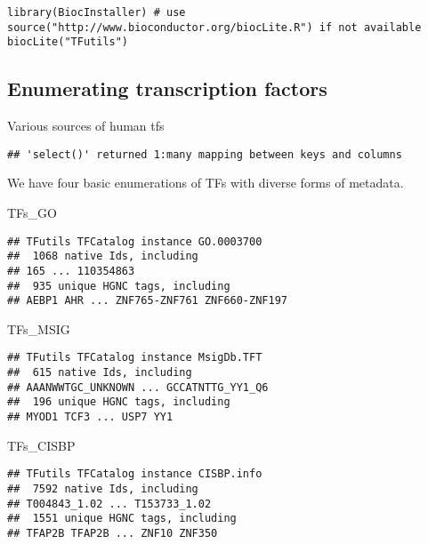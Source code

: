 \documentclass[9pt,a4paper,]{extarticle}
\newenvironment{Shaded}{\begin{snugshade}}{\end{snugshade}}
\newcommand{\NormalTok}[1]{#1}
\begin{document}
\begin{verbatim}
library(BiocInstaller) # use source("http://www.bioconductor.org/biocLite.R") if not available
biocLite("TFutils")
\end{verbatim}

\subsection{Enumerating transcription factors}\label{enumerating-transcription-factors}

Various sources of human tfs

\begin{verbatim}
## 'select()' returned 1:many mapping between keys and columns
\end{verbatim}

We have four basic enumerations of TFs with diverse forms of metadata.

\begin{Shaded}
\begin{Highlighting}[]
\NormalTok{TFs_GO}
\end{Highlighting}
\end{Shaded}

\begin{verbatim}
## TFutils TFCatalog instance GO.0003700 
##  1068 native Ids, including
## 165 ... 110354863 
##  935 unique HGNC tags, including
## AEBP1 AHR ... ZNF765-ZNF761 ZNF660-ZNF197
\end{verbatim}

\begin{Shaded}
\begin{Highlighting}[]
\NormalTok{TFs_MSIG}
\end{Highlighting}
\end{Shaded}

\begin{verbatim}
## TFutils TFCatalog instance MsigDb.TFT 
##  615 native Ids, including
## AAANWWTGC_UNKNOWN ... GCCATNTTG_YY1_Q6 
##  196 unique HGNC tags, including
## MYOD1 TCF3 ... USP7 YY1
\end{verbatim}

\begin{Shaded}
\begin{Highlighting}[]
\NormalTok{TFs_CISBP}
\end{Highlighting}
\end{Shaded}

\begin{verbatim}
## TFutils TFCatalog instance CISBP.info 
##  7592 native Ids, including
## T004843_1.02 ... T153733_1.02 
##  1551 unique HGNC tags, including
## TFAP2B TFAP2B ... ZNF10 ZNF350
\end{verbatim}
\end{document}
